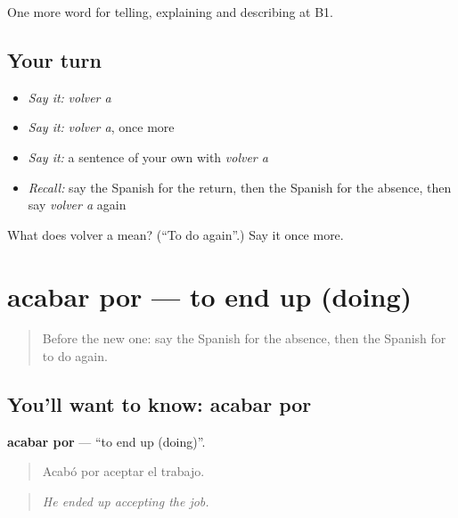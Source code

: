 \begin{grammarlens}[title={What you've built}]
One more word for telling, explaining and describing at B1.
\end{grammarlens}

\subsection*{Your turn}
\begin{itemize}
\raggedright
  \item \emph{Say it:} \emph{volver a}
  \item \emph{Say it:} \emph{volver a}, once more
  \item \emph{Say it:} a sentence of your own with \emph{volver a}
  \item \emph{Recall:} say the Spanish for the return, then the Spanish for the absence, then say \emph{volver a} again
\end{itemize}

\begin{tcolorbox}[breakable,colback=teal!4,colframe=teal!35!black,title={Before you move on}]
What does volver a mean? (\textquotedblleft{}To do again\textquotedblright{}.) Say it once more.
\end{tcolorbox}
\section[acabar por]{acabar por — to end up (doing)}

\label{lesson:ES-C562-acabar-por}



\begin{quote}
Before the new one: say the Spanish for the absence, then the Spanish for to do again.
\end{quote}

\subsection*{You'll want to know: acabar por}
\textbf{acabar por} — \textquotedblleft{}to end up (doing)\textquotedblright{}.

\begin{quote}
Acabó por aceptar el trabajo.
\end{quote}

\begin{quote}
\emph{He ended up accepting the job.}
\end{quote}

